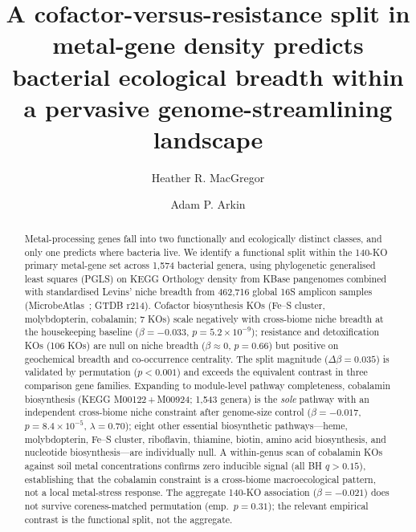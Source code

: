 \documentclass[times]{zHenriquesLab-StyleBioRxiv}
\begin{document}
\noindent%
\title{A cofactor-versus-resistance split in metal-gene density predicts
bacterial ecological breadth within a pervasive genome-streamlining landscape}

\author[1,2,\Letter]{Heather R. MacGregor}
\author[2,3]{Adam P. Arkin}

\maketitle


\begin{abstract}
Metal-processing genes fall into two functionally and ecologically distinct
classes, and only one predicts where bacteria live. We identify a functional
split within the 140-KO primary metal-gene set across 1,574 bacterial genera,
using phylogenetic generalised least squares (PGLS) on KEGG Orthology
density from KBase pangenomes combined with standardised Levins' niche breadth
from 462,716 global 16S amplicon samples (MicrobeAtlas~\cite{rodrigues2026};
GTDB r214). Cofactor biosynthesis KOs (Fe--S cluster, molybdopterin,
cobalamin; 7 KOs) scale negatively with cross-biome niche breadth at the
housekeeping baseline ($\beta = -0.033$, $p = 5.2 \times 10^{-9}$); resistance
and detoxification KOs (106 KOs) are null on niche breadth ($\beta \approx 0$,
$p = 0.66$) but positive on geochemical breadth and co-occurrence centrality.
The split magnitude ($\Delta\beta = 0.035$) is validated by permutation
($p < 0.001$) and exceeds the equivalent contrast in three comparison
gene families. Expanding to module-level pathway completeness, cobalamin
biosynthesis (KEGG M00122\,+\,M00924; 1,543 genera) is the \emph{sole}
pathway with an independent cross-biome niche constraint after genome-size
control ($\beta = -0.017$, $p = 8.4 \times 10^{-5}$, $\lambda = 0.70$);
eight other essential biosynthetic pathways---heme, molybdopterin, Fe--S
cluster, riboflavin, thiamine, biotin, amino acid biosynthesis, and nucleotide
biosynthesis---are individually null. A within-genus scan of cobalamin KOs
against soil metal concentrations confirms zero inducible signal (all BH
$q > 0.15$), establishing that the cobalamin constraint is a cross-biome
macroecological pattern, not a local metal-stress response. The aggregate
140-KO association ($\beta = -0.021$) does not survive coreness-matched
permutation (emp.\ $p = 0.31$); the relevant empirical contrast is the
functional split, not the aggregate.
\end{abstract}
\end{document}
